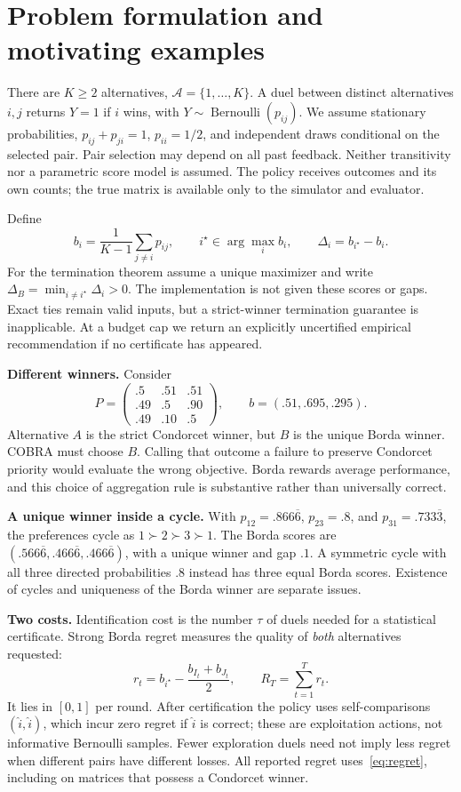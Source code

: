 \documentclass[11pt,a4paper]{article}
\begin{document}
\section{Problem formulation and motivating examples}
There are $K\ge2$ alternatives, $\mathcal A=\{1,\dots,K\}$. A duel between distinct alternatives $i,j$ returns $Y=1$ if $i$ wins, with $Y\sim\operatorname{Bernoulli}(p_{ij})$. We assume stationary probabilities, $p_{ij}+p_{ji}=1$, $p_{ii}=1/2$, and independent draws conditional on the selected pair. Pair selection may depend on all past feedback. Neither transitivity nor a parametric score model is assumed. The policy receives outcomes and its own counts; the true matrix is available only to the simulator and evaluator.

Define
\begin{equation}\label{eq:borda}
b_i=\frac1{K-1}\sum_{j\ne i}p_{ij},\qquad
i^\star\in\arg\max_i b_i,\qquad\Delta_i=b_{i^\star}-b_i.
\end{equation}
For the termination theorem assume a unique maximizer and write $\Delta_B=\min_{i\ne i^\star}\Delta_i>0$. The implementation is not given these scores or gaps. Exact ties remain valid inputs, but a strict-winner termination guarantee is inapplicable. At a budget cap we return an explicitly uncertified empirical recommendation if no certificate has appeared.

\textbf{Different winners.} Consider
\[
P=\begin{pmatrix}.5&.51&.51\\.49&.5&.90\\.49&.10&.5\end{pmatrix},\qquad
b=(.51,.695,.295).
\]
Alternative $A$ is the strict Condorcet winner, but $B$ is the unique Borda winner. COBRA must choose $B$. Calling that outcome a failure to preserve Condorcet priority would evaluate the wrong objective. Borda rewards average performance, and this choice of aggregation rule is substantive rather than universally correct.

\textbf{A unique winner inside a cycle.} With $p_{12}=.866\overline6$, $p_{23}=.8$, and $p_{31}=.733\overline3$, the preferences cycle as $1\succ2\succ3\succ1$. The Borda scores are $(.566\overline6,.466\overline6,.466\overline6)$, with a unique winner and gap $.1$. A symmetric cycle with all three directed probabilities $.8$ instead has three equal Borda scores. Existence of cycles and uniqueness of the Borda winner are separate issues.

\textbf{Two costs.} Identification cost is the number $\tau$ of duels needed for a statistical certificate. Strong Borda regret measures the quality of \emph{both} alternatives requested:
\begin{equation}\label{eq:regret}
r_t=b_{i^\star}-\frac{b_{I_t}+b_{J_t}}2,\qquad R_T=\sum_{t=1}^T r_t.
\end{equation}
It lies in $[0,1]$ per round. After certification the policy uses self-comparisons $(\hat i,\hat i)$, which incur zero regret if $\hat i$ is correct; these are exploitation actions, not informative Bernoulli samples. Fewer exploration duels need not imply less regret when different pairs have different losses. All reported regret uses~\eqref{eq:regret}, including on matrices that possess a Condorcet winner.
\end{document}

